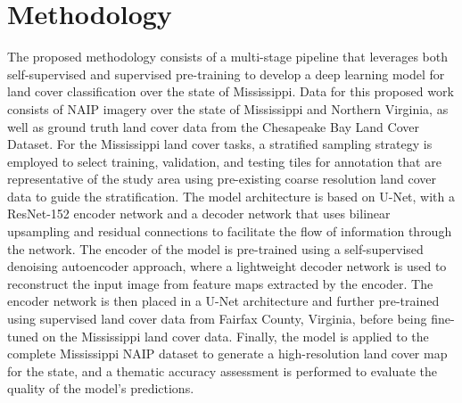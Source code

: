 \section{Methodology}\label{sec:methodology}

The proposed methodology consists of a multi-stage pipeline that leverages both self-supervised and supervised pre-training to develop a deep learning model for land cover classification over the state of Mississippi.
Data for this proposed work consists of NAIP imagery over the state of Mississippi and Northern Virginia, as well as ground truth land cover data from the Chesapeake Bay Land Cover Dataset.
For the Mississippi land cover tasks, a stratified sampling strategy is employed to select training, validation, and testing tiles for annotation that are representative of the study area using pre-existing coarse resolution land cover data to guide the stratification.
The model architecture is based on U-Net, with a ResNet-152 encoder network and a decoder network that uses bilinear upsampling and residual connections to facilitate the flow of information through the network.
The encoder of the model is pre-trained using a self-supervised denoising autoencoder approach, where a lightweight decoder network is used to reconstruct the input image from feature maps extracted by the encoder.
The encoder network is then placed in a U-Net architecture and further pre-trained using supervised land cover data from Fairfax County, Virginia, before being fine-tuned on the Mississippi land cover data.
Finally, the model is applied to the complete Mississippi NAIP dataset to generate a high-resolution land cover map for the state, and a thematic accuracy assessment is performed to evaluate the quality of the model's predictions.






